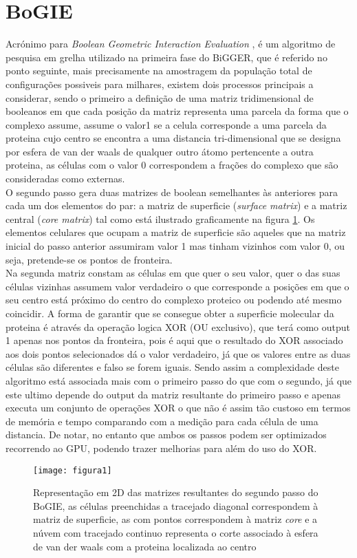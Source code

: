 \section{BoGIE}
\label{bogieAlg}
Acrónimo para \textit{Boolean Geometric Interaction Evaluation}\cite{teseProf} \cite{biggerPaper}, é um algoritmo de pesquisa em grelha utilizado na primeira fase do BiGGER, que é referido no ponto seguinte, mais precisamente na amostragem da população total de configurações possiveis para milhares, existem dois processos principais a considerar, sendo o primeiro a definição de uma matriz tridimensional de booleanos em que cada posição da matriz representa uma parcela da forma que o complexo assume, assume o valor1 se a celula corresponde a uma parcela da proteina cujo centro se encontra a uma distancia tri-dimensional que se designa por esfera de van der waals de qualquer outro átomo pertencente a outra proteina, as células com o valor 0 correspondem a frações do complexo que são consideradas como externas.\\
O segundo passo gera duas matrizes de boolean semelhantes às anteriores para cada um dos elementos do par: a matriz de superficie (\textit{surface matrix}) e a matriz central (\textit{core matrix}) tal como está ilustrado graficamente na figura \ref{fig:fig2subfig}. Os elementos celulares que ocupam a matriz de superficie são aqueles que na matriz inicial do passo anterior assumiram valor 1 mas tinham vizinhos com valor 0, ou seja, pretende-se os pontos de fronteira.\\ Na segunda matriz constam as células em que quer o seu valor, quer o das suas células vizinhas assumem valor verdadeiro o que corresponde a posições em que o seu centro está próximo do centro do complexo proteico ou podendo até mesmo coincidir. A forma de garantir que se consegue obter a superficie molecular da proteina é através da operação logica XOR (OU exclusivo), que terá como output 1 apenas nos pontos da fronteira, pois é aqui que o resultado do XOR associado aos dois pontos selecionados dá o valor verdadeiro, já que os valores entre as duas células são diferentes e falso se forem iguais.
Sendo assim  a complexidade deste algoritmo está associada mais com o primeiro passo do que com o segundo, já que este ultimo depende do output da matriz resultante do primeiro passo e apenas executa um conjunto de operações XOR o que não é assim tão custoso em termos de memória e tempo comparando com a medição para cada célula de uma distancia.
De notar, no entanto que ambos os passos podem ser optimizados recorrendo ao GPU, podendo trazer melhorias para além do uso do XOR.
\begin{figure}[htbp]
  \centering
    {\texttt{[image: figura1]}}%
  \caption{Representação em 2D das matrizes resultantes do segundo passo do BoGIE, as células preenchidas a tracejado diagonal correspondem à matriz de superficie, as com pontos correspondem à matriz \textit{core} e a núvem com tracejado continuo representa o corte associado à esfera de van der waals com a proteina localizada ao centro \cite{biggerPaper}}
  \label{fig:fig2subfig}
\end{figure}

